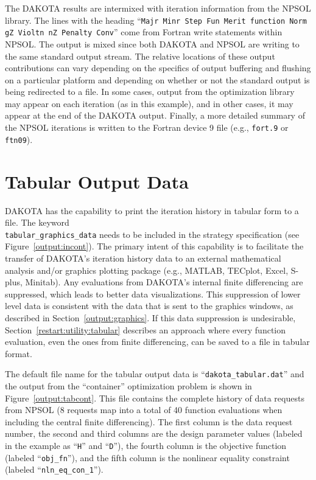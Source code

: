 The DAKOTA results are intermixed with iteration information from the
NPSOL library. The lines with the heading ``\texttt{Majr Minr Step Fun
  Merit function Norm gZ Violtn nZ Penalty Conv}'' come from Fortran
write statements within NPSOL. The output is mixed since both DAKOTA
and NPSOL are writing to the same standard output stream. The relative
locations of these output contributions can vary depending on the
specifics of output buffering and flushing on a particular platform
and depending on whether or not the standard output is being
redirected to a file. In some cases, output from the optimization
library may appear on each iteration (as in this example), and in
other cases, it may appear at the end of the DAKOTA output. Finally, a
more detailed summary of the NPSOL iterations is written to the
Fortran device 9 file (e.g., \texttt{fort.9} or \texttt{ftn09}).

\section{Tabular Output Data}\label{output:tabular}

DAKOTA has the capability to print the iteration history in tabular
form to a file. The keyword\\
\texttt{tabular\_graphics\_data} needs to be included in the strategy 
specification (see Figure~\ref{output:incont}). The primary intent
of this capability is to facilitate the transfer of DAKOTA's iteration
history data to an external mathematical analysis and/or graphics
plotting package (e.g., MATLAB, TECplot, Excel, S-plus, Minitab). Any
evaluations from DAKOTA's internal finite differencing are suppressed,
which leads to better data visualizations. This suppression of lower
level data is consistent with the data that is sent to the graphics
windows, as described in Section~\ref{output:graphics}. If this data
suppression is undesirable, Section~\ref{restart:utility:tabular}
describes an approach where every function evaluation, even the ones
from finite differencing, can be saved to a file in tabular format.

The default file name for the tabular output data is
``\texttt{dakota\_tabular.dat}'' and the output from the ``container''
optimization problem is shown in Figure~\ref{output:tabcont}. This
file contains the complete history of data requests from NPSOL (8
requests map into a total of 40 function evaluations when including
the central finite differencing). The first column is the data request
number, the second and third columns are the design parameter values
(labeled in the example as ``\texttt{H}'' and ``\texttt{D}''), the
fourth column is the objective function (labeled
``\texttt{obj\_fn}''), and the fifth column is the nonlinear equality
constraint (labeled ``\texttt{nln\_eq\_con\_1}'').

